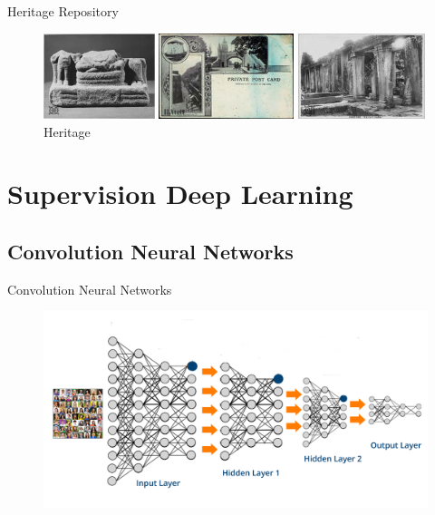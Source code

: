 \documentclass[12pt]{beamer}
\begin{document}
\begin{frame}{Heritage Repository}
\begin{figure}[!htb]
\begin{minipage}{0.25\linewidth}
  \includegraphics[height=2.5cm]{images/sample/heritage_145}\hfill
  \caption*{Heritage}
\end{minipage}
\hfill
\begin{minipage}{0.30\linewidth}
  \includegraphics[height=2.5cm]{images/sample/other_202}\hfill
  \caption*{Other}
\end{minipage}%
\hfill
\begin{minipage}{0.31\linewidth}
  \includegraphics[height=2.5cm]{images/sample/heritage_282}%
  \caption*{Heritage}
\end{minipage}%

\end{figure}
\end{frame}

\section{Supervision Deep Learning}
\subsection{Convolution Neural Networks}

\begin{frame}{Convolution Neural Networks}
\begin{figure}
\includegraphics[width=\textwidth]{images/Deep-Neural-Network-What-is-Deep-Learning-Edureka}
\end{figure}
\end{frame}
\end{document}
